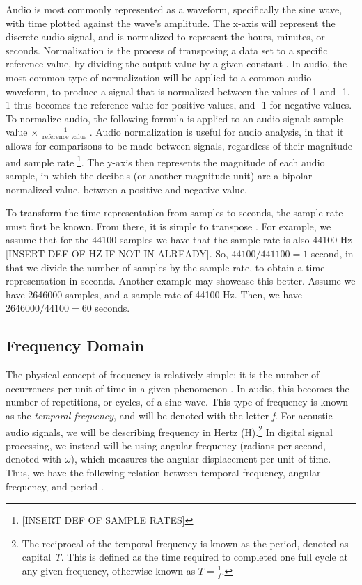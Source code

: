 Audio is most commonly represented as a waveform, specifically the sine wave, with time plotted against the wave's amplitude. The x-axis will represent the discrete audio signal, and is normalized to represent the hours, minutes, or seconds. Normalization is the process of transposing a data set to a specific reference value, by dividing the output value by a given constant \cite{Zjalic_2021}. In audio, the most common type of normalization will be applied to a common audio waveform, to produce a signal that is normalized between the values of 1 and -1. 1 thus becomes the reference value for positive values, and -1 for negative values. To normalize audio, the following formula is applied to an audio signal: sample value $\times$ $\frac{1}{\textrm{reference value }}$. Audio normalization is useful for audio analysis, in that it allows for comparisons to be made between signals, regardless of their magnitude and sample rate \footnote{[INSERT DEF OF SAMPLE RATES]}. The y-axis then represents the magnitude of each audio sample, in which the decibels (or another magnitude unit) are a bipolar normalized value, between a positive and negative value. 

To transform the time representation from samples to seconds, the sample rate must first be known. From there, it is simple to transpose \cite{Zjalic_2021}. For example, we assume that for the 44100 samples we have that the sample rate is also 44100 Hz [INSERT DEF OF HZ IF NOT IN ALREADY]. So, $44100 / 441100 = 1$ second, in that we divide the number of samples by the sample rate, to obtain a time representation in seconds. Another example may showcase this better. Assume we have 2646000 samples, and a sample rate of 44100 Hz. Then, we have $2646000/44100 = 60$ seconds.

\subsection{Frequency Domain}
The physical concept of frequency is relatively simple: it is the number of occurrences per unit of time in a given phenomenon \cite{Gabrielli_2020}. In audio, this becomes the number of repetitions, or cycles, of a sine wave. This type of frequency is known as the \textit{temporal frequency}, and will be denoted with the letter \textit{f}. For acoustic audio signals, we will be describing frequency in Hertz (H).\footnote{The reciprocal of the temporal frequency is known as the period, denoted as capital \textit{T}. This is defined as the time required to completed one full cycle at any given frequency, otherwise known as $T = \frac{1}{\textit{f}}$.} In digital signal processing, we instead will be using angular frequency (radians per second, denoted with $\omega$), which measures the angular displacement per unit of time. Thus, we have the following relation between temporal frequency, angular frequency, and period \cite{Gabrielli_2020}.

